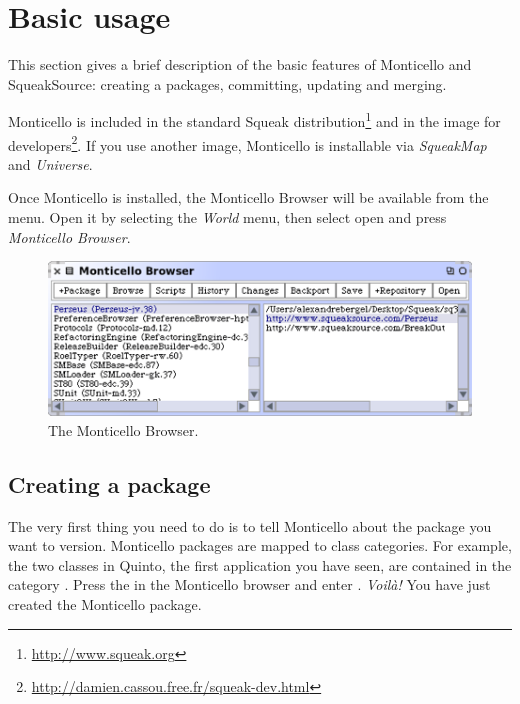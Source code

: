 \documentclass[a4paper,10pt,twoside]{book}
\begin{document}
\section{Basic usage}

This section gives a brief description of the basic features of Monticello and SqueakSource: creating a packages, committing, updating and merging.

Monticello is included in the standard Squeak distribution\footnote{\url{http://www.squeak.org}} and in the image for developers\footnote{\url{http://damien.cassou.free.fr/squeak-dev.html}}. If you use another image, Monticello is installable via \emph{SqueakMap} and \emph{Universe}.

Once Monticello is installed, the Monticello Browser will be available from the  menu. Open it by selecting the \emph{World} menu, then select open and press \emph{Monticello Browser}.

\begin{figure}[ht]\centering
	\includegraphics[width=.75\linewidth]{monticello.png}
	\caption{The Monticello Browser.}
\end{figure}

\subsection{Creating a package}

The very first thing you need to do is to tell Monticello about the package you want to version. Monticello packages are mapped to class categories. For example, the two classes in Quinto, the first application you have seen, are contained in the category . Press the  in the Monticello browser and enter . \emph{Voil\`a!} You have just created the  Monticello package. 

\end{document}
